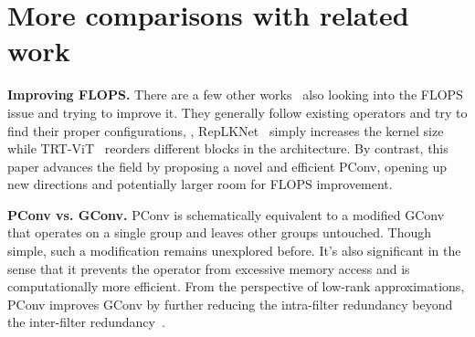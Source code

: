 
\section{More comparisons with related work}
\medskip\noindent\textbf{Improving FLOPS.} \enspace 
There are a few other works~\cite{ding2022scaling_short,xia2022trt_short} also looking into the FLOPS issue and trying to improve it. They generally follow existing operators and try to find their proper configurations, \eg, RepLKNet~\cite{ding2022scaling_short} simply increases the kernel size while TRT-ViT~\cite{xia2022trt_short} reorders different blocks in the architecture. By contrast, this paper advances the field by proposing a novel and efficient PConv, opening up new directions and potentially larger room for FLOPS improvement.


% 
% 

\medskip\noindent\textbf{PConv vs. GConv.} \enspace 
PConv is schematically equivalent to a modified GConv~\cite{krizhevsky2012imagenet} that operates on a single group and leaves other groups untouched. Though simple, such a modification remains unexplored before. It's also significant in the sense that it prevents the operator from excessive memory access and is computationally more efficient. From the perspective of low-rank approximations, PConv improves GConv by further reducing the intra-filter redundancy beyond the inter-filter redundancy~\cite{haase2020rethinking_short}.

